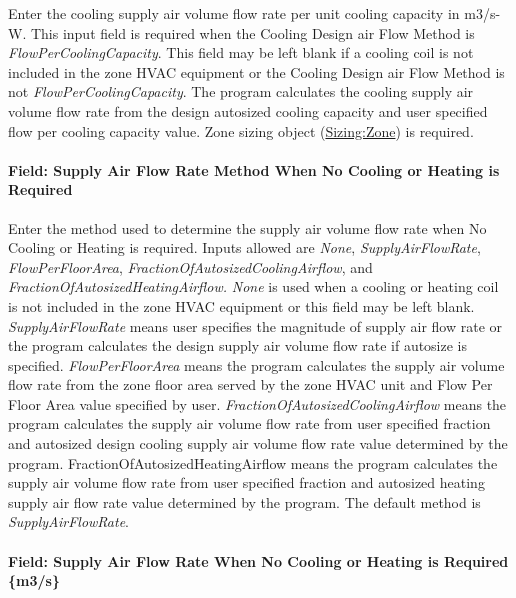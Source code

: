 Enter the cooling supply air volume flow rate per unit cooling capacity in m3/s-W. This input field is required when the Cooling Design air Flow Method is \emph{FlowPerCoolingCapacity}. This field may be left blank if a cooling coil is not included in the zone HVAC equipment or the Cooling Design air Flow Method is not \emph{FlowPerCoolingCapacity}. The program calculates the cooling supply air volume flow rate from the design autosized cooling capacity and user specified flow per cooling capacity value. Zone sizing object (\hyperref[sizingzone]{Sizing:Zone}) is required.

\paragraph{Field: Supply Air Flow Rate Method When No Cooling or Heating is Required}\label{field-supply-air-flow-rate-method-when-no-cooling-or-heating-is-required}

Enter the method used to determine the supply air volume flow rate when No Cooling or Heating is required. Inputs allowed are \emph{None}, \emph{SupplyAirFlowRate}, \emph{FlowPerFloorArea}, \emph{FractionOfAutosizedCoolingAirflow}, and \emph{FractionOfAutosizedHeatingAirflow.} \emph{None} is used when a cooling or heating coil is not included in the zone HVAC equipment or this field may be left blank. \emph{SupplyAirFlowRate} means user specifies the magnitude of supply air flow rate or the program calculates the design supply air volume flow rate if autosize is specified. \emph{FlowPerFloorArea} means the program calculates the supply air volume flow rate from the zone floor area served by the zone HVAC unit and Flow Per Floor Area value specified by user. \emph{FractionOfAutosizedCoolingAirflow} means the program calculates the supply air volume flow rate from user specified fraction and autosized design cooling supply air volume flow rate value determined by the program. FractionOfAutosizedHeatingAirflow means the program calculates the supply air volume flow rate from user specified fraction and autosized heating supply air flow rate value determined by the program. The default method is \emph{SupplyAirFlowRate}.

\paragraph{Field: Supply Air Flow Rate When No Cooling or Heating is Required \{m3/s\}}\label{field-supply-air-flow-rate-when-no-cooling-or-heating-is-required-m3s}

